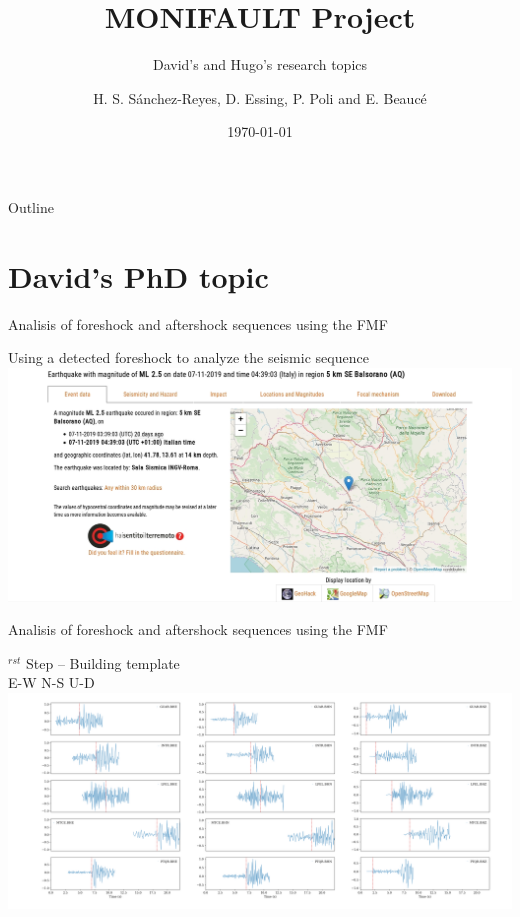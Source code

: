 \documentclass[aspectratio=43,9pt]{beamer}
\title{MONIFAULT Project}								%
\subtitle{David's and Hugo's research topics}
\date{\today}
\author{H. S. S\'anchez-Reyes, D. Essing, P. Poli and E. Beauc\'e }								%
\institute{ISTerre, Universit\'e Grenoble Alpes}							%
\begin{document}
\maketitle


\begin{frame}{Outline}
\small \tableofcontents[hideallsubsections] 
\end{frame}


\section{David's PhD topic}

\begin{frame}{Analisis of foreshock and aftershock sequences using the FMF}
 
  \hskip -1.3cm \begin{minipage}{1\linewidth}
    \centering Using a detected foreshock to analyze the seismic sequence \\
    \vskip 0.4cm
    \centering \includegraphics[width=1.2\linewidth]{figs/1_fore_shock}
  \end{minipage}
   
\end{frame}


\begin{frame}{Analisis of foreshock and aftershock sequences using the FMF}

  \hskip -1.5cm \begin{minipage}{1\linewidth}
    $^{rst}$ Step -- Building template \\
    \vskip 0.2cm
    \centering E-W  \hskip 3.5cm  N-S \hskip 3.8cm U-D \\
    \centering \includegraphics[width=1.2\linewidth]{figs/2_ml_2p5_2019-11-07_phase_arrivals}
  \end{minipage}

\end{frame}
\end{document}
